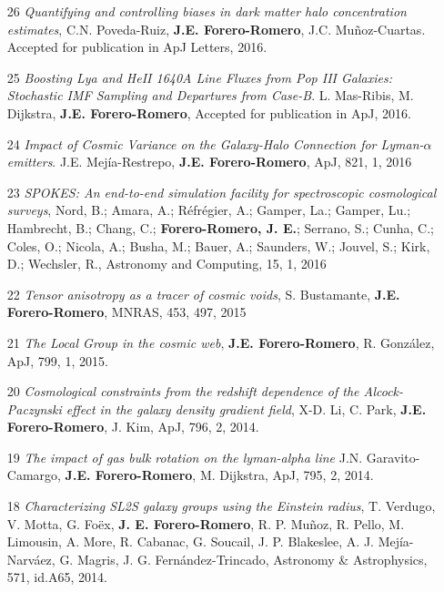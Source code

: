 \documentclass[letterpaper,11pt,onecolumn]{article}
\begin{document}
\begin{enumerate}

\item[26]{\it Quantifying and controlling biases in dark matter halo
  concentration estimates}, C.N. Poveda-Ruiz, {\bf
  J.E. Forero-Romero}, J.C. Mu\~noz-Cuartas. Accepted for publication
  in ApJ Letters, 2016.

\item[25]{\it Boosting Lya and HeII 1640A Line Fluxes from Pop III
  Galaxies: Stochastic IMF Sampling and Departures from
  Case-B}. L. Mas-Ribis, M. Dijkstra, {\bf J.E. Forero-Romero},
  Accepted for publication in ApJ, 2016.

\item[24]{\it Impact of Cosmic Variance on the Galaxy-Halo Connection
  for Lyman-$\alpha$ emitters}.  J.E. Mej\'ia-Restrepo, {\bf
  J.E. Forero-Romero}, ApJ, 821, 1, 2016

\item[23]{\it SPOKES: An end-to-end simulation facility for
  spectroscopic cosmological surveys}, 
	Nord, B.; Amara, A.; R\'efr\'egier, A.; Gamper, La.; Gamper, Lu.;
        Hambrecht, B.; Chang, C.; {\bf Forero-Romero, J. E.}; Serrano, S.;
        Cunha, C.; Coles, O.; Nicola, A.; Busha, M.; Bauer, A.;
        Saunders, W.; Jouvel, S.; Kirk, D.; Wechsler, R., Astronomy
        and Computing, 15, 1, 2016

\item[22]{\it Tensor anisotropy as a tracer of cosmic voids},
  S. Bustamante, {\bf   J.E. Forero-Romero}, MNRAS, 453,
  497, 2015

\item[21]{\it The Local Group in the cosmic web}, {\bf
  J.E. Forero-Romero}, R. Gonz\'alez, ApJ, 799, 1, 2015.

\item[20]{\it Cosmological constraints from the redshift dependence of
  the Alcock-Paczynski effect in the galaxy density gradient field},
  X-D. Li, C. Park, {\bf J.E. Forero-Romero}, J. Kim, ApJ, 796, 2,
  2014.


\item[19]{\it The impact of gas bulk rotation on the lyman-alpha line}
  J.N. Garavito-Camargo,  {\bf J.E. Forero-Romero}, M. Dijkstra, ApJ,
  795, 2, 2014. 
 

\item[18]{\it  Characterizing SL2S galaxy groups using the Einstein
  radius}, T. Verdugo, V. Motta, G. Fo\"ex, {\bf J. E. Forero-Romero},
  R. P. Mu\~noz, R. Pello, M. Limousin, A. More, R. Cabanac, G. Soucail,
  J. P. Blakeslee, A. J. Mej\'ia-Narv\'aez, G. Magris,
  J. G. Fern\'andez-Trincado, Astronomy \& Astrophysics, 571, id.A65, 2014.



\end{enumerate}
\end{document}
